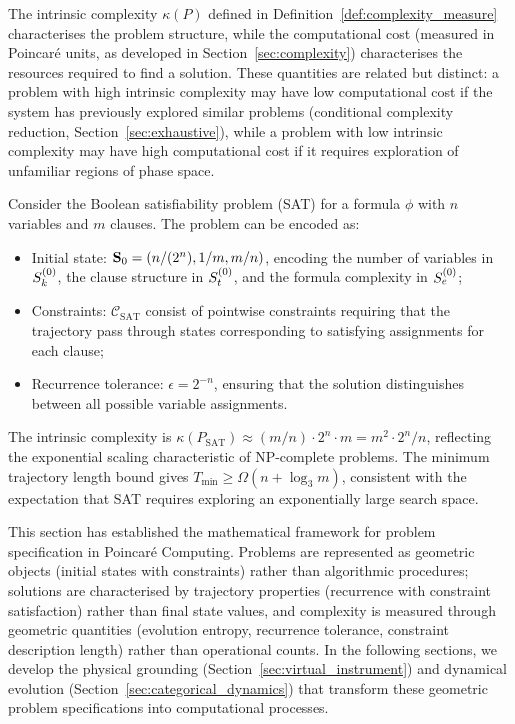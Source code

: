 \begin{remark}
\label{rem:complexity_vs_cost}
The intrinsic complexity $\kappa(P)$ defined in Definition~\ref{def:complexity_measure} characterises the problem structure, while the computational cost (measured in Poincaré units, as developed in Section~\ref{sec:complexity}) characterises the resources required to find a solution. These quantities are related but distinct: a problem with high intrinsic complexity may have low computational cost if the system has previously explored similar problems (conditional complexity reduction, Section~\ref{sec:exhaustive}), while a problem with low intrinsic complexity may have high computational cost if it requires exploration of unfamiliar regions of phase space.
\end{remark}

\begin{example}
\label{ex:sat_encoding}
Consider the Boolean satisfiability problem (SAT) for a formula $\phi$ with $n$ variables and $m$ clauses. The problem can be encoded as:
\begin{itemize}
    \item Initial state: $\mathbf{S}_0 = (n/(2^n), 1/m, m/n)$, encoding the number of variables in $S_k^{(0)}$, the clause structure in $S_t^{(0)}$, and the formula complexity in $S_e^{(0)}$;
    \item Constraints: $\mathcal{C}_{\text{SAT}}$ consist of pointwise constraints requiring that the trajectory pass through states corresponding to satisfying assignments for each clause;
    \item Recurrence tolerance: $\epsilon = 2^{-n}$, ensuring that the solution distinguishes between all possible variable assignments.
\end{itemize}
The intrinsic complexity is $\kappa(P_{\text{SAT}}) \approx (m/n) \cdot 2^n \cdot m = m^2 \cdot 2^n / n$, reflecting the exponential scaling characteristic of NP-complete problems. The minimum trajectory length bound gives $T_{\min} \geq \Omega(n + \log_3 m)$, consistent with the expectation that SAT requires exploring an exponentially large search space.
\end{example}

This section has established the mathematical framework for problem specification in Poincaré Computing. Problems are represented as geometric objects (initial states with constraints) rather than algorithmic procedures; solutions are characterised by trajectory properties (recurrence with constraint satisfaction) rather than final state values, and complexity is measured through geometric quantities (evolution entropy, recurrence tolerance, constraint description length) rather than operational counts. In the following sections, we develop the physical grounding (Section~\ref{sec:virtual_instrument}) and dynamical evolution (Section~\ref{sec:categorical_dynamics}) that transform these geometric problem specifications into computational processes.
